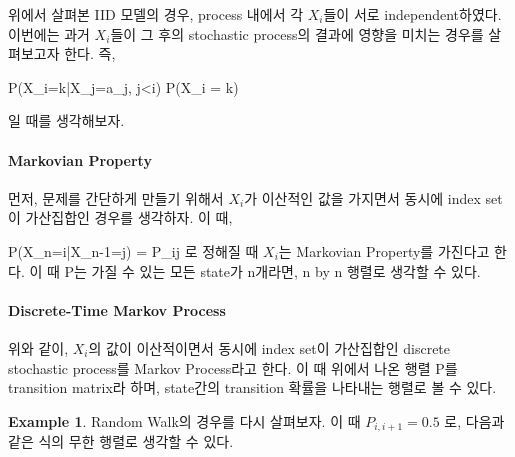 \documentclass[twoside]{article}
\theoremstyle{definition}
\newtheorem{ex}{Example}[section]
\newenvironment{eq}{\equation}{\endequation}
\begin{document}
위에서 살펴본 IID 모델의 경우, process 내에서 각 $X_i$들이 서로 independent하였다. 이번에는 과거 $X_i$들이 그 후의 stochastic process의 결과에 영향을 미치는 경우를 살펴보고자 한다. 즉, 

\begin{eq} 
P(X_i=k|X_j=a_j, j<i) \neq P(X_i = k)
\end{eq}

일 때를 생각해보자. 

\paragraph{Markovian Property}

먼저, 문제를 간단하게 만들기 위해서 $X_i$가 이산적인 값을 가지면서 동시에 index set이 가산집합인 경우를 생각하자. 이 때, 

\begin{eq}
P(X_n=i|X_{n-1}=j) = P_{ij}
\end{eq}
로 정해질 때 $X_i$는 Markovian Property를 가진다고 한다. 이 때 P는 가질 수 있는 모든 state가 n개라면, n by n 행렬로 생각할 수 있다. 






\paragraph{Discrete-Time Markov Process} 

위와 같이, $X_i$의 값이 이산적이면서 동시에 index set이 가산집합인 discrete stochastic process를 Markov Process라고 한다. 이 때 위에서 나온 행렬 P를 transition matrix라 하며, state간의 transition 확률을 나타내는 행렬로 볼 수 있다. 

\begin{ex}
Random Walk의 경우를 다시 살펴보자. 이 때 $P_{i,i+1} = 0.5$ 로, 다음과 같은 식의 무한 행렬로 생각할 수 있다. 
\begin{eq}
\left[
\begin{matrix} 
0   & 0.5   & 0     & 0     & ... \\
0.5 & 0     & 0.5   & 0     & ... \\
0   & 0.5   & 0     & 0.5   & ... \\
0   & 0     & 0.5   & 0   & ... \\
\end{matrix}
\right]
\end{eq}
\end{ex}
\end{document}
